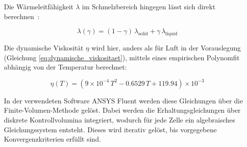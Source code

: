 Die Wärmeleitfähigkeit $\lambda$ im Schmelzbereich hingegen lässt sich direkt berechnen~\cite{akamcae-udf}:

\begin{equation}
  \label{eq:udf_lambda}
  \lambda(\gamma)= (1-\gamma)\,\lambda_{\mathrm{solid}} + \gamma\,\lambda_{\mathrm{liquid}}
\end{equation}

Die dynamische Viskosität $\eta$ wird hier, anders als für Luft in der Vorauslegung (Gleichung \ref{eq:dynamische_viskositaet}), mittels eines empirischen
Polynomfit~\cite{akamcae-udf} abhängig von der Temperatur berechnet:

\begin{equation}
  \label{eq:udf_mu}
  \eta(T)= \left(9\times 10^{-4}\,T^{2} - 0.6529\,T + 119.94\right)\times 10^{-3}
\end{equation}

In der verwendeten Software ANSYS Fluent werden diese Gleichungen über die Finite-Volumen-Methode gelöst. Dabei werden die Erhaltungsgleichungen
über diskrete Kontrollvolumina integriert, wodurch für jede Zelle ein algebraisches Gleichungssystem entsteht. Dieses
wird iterativ gelöst, bis vorgegebene Konvergenzkriterien erfüllt sind.